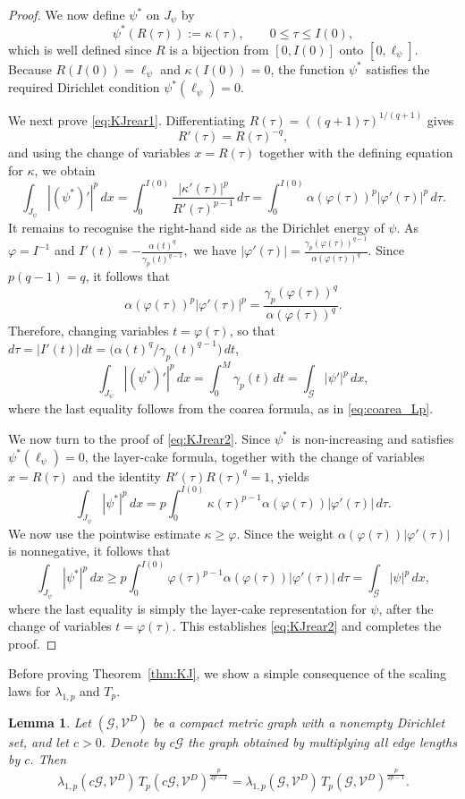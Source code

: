 \documentclass[12pt,a4paper]{article}
\numberwithin{equation}{section}
\newtheorem{lemma}[theorem]{Lemma}
\begin{document}
\begin{proof}
	We now define $\psi^*$ on $J_\psi$ by
	\[
	\psi^*(R(\tau))
	:=
	\kappa(\tau),
	\qquad
	0\le\tau\le I(0),
	\]
	which is well defined since $R$ is a bijection from $[0,I(0)]$ onto
	$[0,\ell_\psi]$. Because $R(I(0))=\ell_\psi$ and
	$\kappa(I(0))=0$, the function $\psi^*$ satisfies the required
	Dirichlet condition
	\(
	\psi^*(\ell_\psi)=0.
	\)
	
	We next prove \eqref{eq:KJrear1}. Differentiating
	$R(\tau)=((q+1)\tau)^{1/(q+1)}$ gives
	\[
	R'(\tau)=R(\tau)^{-q},
	\]
	and using the change of variables $x=R(\tau)$ together with the defining
	equation for $\kappa$, we obtain
	\[
	\int_{J_\psi}|(\psi^*)'|^p\,dx
	=
	\int_0^{I(0)}
	\frac{|\kappa'(\tau)|^p}{R'(\tau)^{p-1}}\,d\tau
	=
	\int_0^{I(0)}
	\alpha(\varphi(\tau))^p
	|\varphi'(\tau)|^p\,d\tau.
	\]
		It remains to recognise the right-hand side as the Dirichlet energy of
		$\psi$. As \(\varphi=I^{-1}\) and
		\(
		I'(t)
		=
		-\frac{\alpha(t)^q}{\gamma_p(t)^{q-1}},
		\)
		we have
		\(
		|\varphi'(\tau)|
		=
		\frac{\gamma_p(\varphi(\tau))^{q-1}}
		{\alpha(\varphi(\tau))^q}.
		\)
		Since \(p(q-1)=q\), it follows that
		\[
		\alpha(\varphi(\tau))^p|\varphi'(\tau)|^p
		=
		\frac{\gamma_p(\varphi(\tau))^q}
		{\alpha(\varphi(\tau))^q}.
		\]
		Therefore, changing variables \(t=\varphi(\tau)\), so that
		$d\tau=|I'(t)|\,dt=\bigl(\alpha(t)^q/\gamma_p(t)^{q-1}\bigr)\,dt$,
		\[
		\int_{J_\psi}|(\psi^*)'|^p\,dx
		=
		\int_0^M \gamma_p(t)\,dt
		=
		\int_{\mathcal G}|\psi'|^p\,dx,
		\]
		where the last equality follows from the coarea formula, as in
		\eqref{eq:coarea_Lp}.
		
	We now turn to the proof of \eqref{eq:KJrear2}. Since $\psi^*$ is
	non-increasing and satisfies $\psi^*(\ell_\psi)=0$, the layer-cake
	formula, together with the change of variables $x=R(\tau)$ and the
	identity $R'(\tau)R(\tau)^q=1$, yields
	\[
	\int_{J_\psi}|\psi^*|^p\,dx
	=
	p\int_0^{I(0)}
	\kappa(\tau)^{p-1}
	\alpha(\varphi(\tau))
	|\varphi'(\tau)|\,d\tau.
	\]
	We now use the pointwise estimate
	$\kappa\ge\varphi$. Since the weight
	$\alpha(\varphi(\tau))|\varphi'(\tau)|$ is nonnegative, it follows that
	\[
	\int_{J_\psi}|\psi^*|^p\,dx
	\ge
	p\int_0^{I(0)}
	\varphi(\tau)^{p-1}
	\alpha(\varphi(\tau))
	|\varphi'(\tau)|\,d\tau
	=
	\int_{\mathcal G}|\psi|^p\,dx,
	\]
	where the last equality is simply the layer-cake representation for
	$\psi$, after the change of variables $t=\varphi(\tau)$. This establishes
	\eqref{eq:KJrear2} and completes the proof.
	\end{proof}
	Before proving Theorem~\ref{thm:KJ}, we show a simple consequence of the
	scaling laws for $\lambda_{1,p}$ and $T_p$.
	\begin{lemma}
		\label{lem:KJscaling}
		Let $(\mathcal G,\mathcal V^D)$ be a compact metric graph with a nonempty
		Dirichlet set, and let $c>0$. Denote by
		$c\mathcal G$ the graph obtained by multiplying all edge lengths by $c$.
		Then
		\[
		\lambda_{1,p}(c\mathcal G,\mathcal V^D)\,
		T_p(c\mathcal G,\mathcal V^D)^{\frac{p}{2p-1}}
		=
		\lambda_{1,p}(\mathcal G,\mathcal V^D)\,
		T_p(\mathcal G,\mathcal V^D)^{\frac{p}{2p-1}}.
		\]
	\end{lemma}
	
\end{document}
